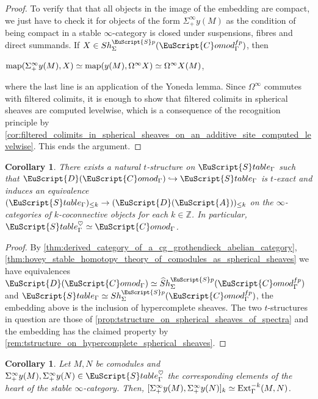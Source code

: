 \documentclass[oneside,a4paper]{amsart}
\newcommand{\euscr}[1]{\EuScript{#1}} %
\newcommand{\acat}{\euscr{A}} %
\newcommand{\dcat}{\euscr{D}} %
\newcommand{\Ext}{\textnormal{Ext}} %
\newcommand{\map}{\textnormal{map}} %
\newcommand{\spectra}{\euscr{S}p} %
\newcommand{\hpsheaves}{\widehat{S}h} %
\newcommand{\Comod}{\euscr{C}omod} %
\newcommand{\ComodGamma}{\Comod_{\Gamma}} %
\newcommand{\sigmainfty}{\Sigma^{\infty}_{+}} %
\theoremstyle{plain}
\newtheorem{cor}[thm]{Corollary}
\theoremstyle{definition}
\theoremstyle{remark}
\begin{document}
\begin{proof}
To verify that that all objects in the image of the embedding are compact, we just have to check it for objects of the form $\sigmainfty y(M)$ as the condition of being compact in a stable $\infty$-category is closed under suspensions, fibres and direct summands. If $X \in Sh_{\Sigma}^{\spectra}(\ComodGamma^{fp})$, then 
\begin{center}
$\map(\Sigma^{\infty}_{+} y(M), X) \simeq \map(y(M), \Omega^{\infty}X) \simeq \Omega^{\infty} X(M)$, 
\end{center}
where the last line is an application of the Yoneda lemma. Since $\Omega^{\infty}$ commutes with filtered colimits, it is enough to show that filtered colimits in spherical sheaves are computed levelwise, which is a consequence of the recognition principle by \cref{cor:filtered_colimits_in_spherical_sheaves_on_an_additive_site_computed_levelwise}. This ends the argument. 
\end{proof}

\begin{cor}
\label{cor:t_structure_on_hoveys_stable_infty_category}
There exists a natural $t$-structure on $\euscr{S}table_{\Gamma}$ such that $\dcat(\ComodGamma) \hookrightarrow \euscr{S}table_{\Gamma}$ is $t$-exact and induces an equivalence $(\euscr{S}table_{\Gamma})_{\leq k} \rightarrow (\dcat(\acat))_{\leq k}$ on the $\infty$-categories of $k$-coconnective objects for each $k \in \mathbb{Z}$. In particular, $\euscr{S}table_{\Gamma}^{\heartsuit} \simeq \ComodGamma$. 
\end{cor}

\begin{proof}
By \cref{thm:derived_category_of_a_cg_grothendieck_abelian_category}, \cref{thm:hovey_stable_homotopy_theory_of_comodules_as_spherical_sheaves} we have equivalences $\dcat(\ComodGamma) \simeq \hpsheaves_{\Sigma}^{\spectra}(\ComodGamma^{fp})$ and $\euscr{S}table_{\Gamma} \simeq Sh_{\Sigma}^{\spectra}(\ComodGamma^{fp})$, the embedding above is the inclusion of hypercomplete sheaves. The two $t$-structures in question are those of \cref{prop:tstructure_on_spherical_sheaves_of_spectra} and the embedding has the claimed property by \cref{rem:tstructure_on_hypercomplete_spherical_sheaves}. 
\end{proof}

\begin{cor}
\label{cor:homotopy_classes_of_maps_in_hoveys_stable_category_compute_ext_groups}
Let $M, N$ be comodules and $\sigmainfty y(M), \sigmainfty y(N) \in \euscr{S}table_{\Gamma}^{\heartsuit}$ the corresponding elements of the heart of the stable $\infty$-category. Then, $[\sigmainfty y(M), \sigmainfty y(N)]_{k} \simeq \Ext_{\Gamma}^{-k}(M, N)$.
\end{cor}
\end{document}

